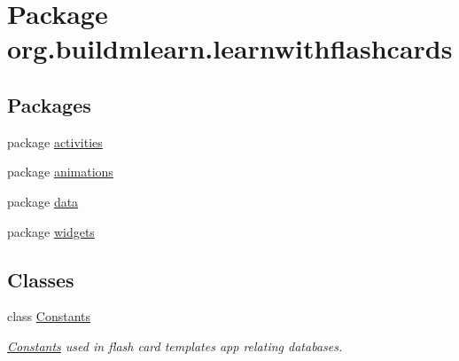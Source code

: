 \hypertarget{namespaceorg_1_1buildmlearn_1_1learnwithflashcards}{}\section{Package org.\+buildmlearn.\+learnwithflashcards}
\label{namespaceorg_1_1buildmlearn_1_1learnwithflashcards}
\subsection*{Packages}
\begin{DoxyCompactItemize}
\item 
package \hyperlink{namespaceorg_1_1buildmlearn_1_1learnwithflashcards_1_1activities}{activities}
\item 
package \hyperlink{namespaceorg_1_1buildmlearn_1_1learnwithflashcards_1_1animations}{animations}
\item 
package \hyperlink{namespaceorg_1_1buildmlearn_1_1learnwithflashcards_1_1data}{data}
\item 
package \hyperlink{namespaceorg_1_1buildmlearn_1_1learnwithflashcards_1_1widgets}{widgets}
\end{DoxyCompactItemize}
\subsection*{Classes}
\begin{DoxyCompactItemize}
\item 
class \hyperlink{classorg_1_1buildmlearn_1_1learnwithflashcards_1_1Constants}{Constants}
\begin{DoxyCompactList}\small\item\em \hyperlink{classorg_1_1buildmlearn_1_1learnwithflashcards_1_1Constants}{Constants} used in flash card template\textquotesingle{}s app relating databases. \end{DoxyCompactList}\end{DoxyCompactItemize}
